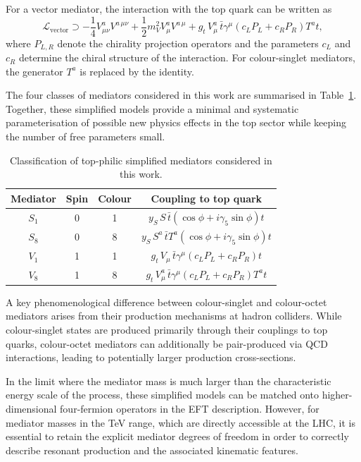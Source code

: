 For a vector mediator, the interaction with the top quark can be written as
\begin{equation}
\mathcal{L}_{\text{vector}} \supset
-\frac{1}{4} V^a_{\mu\nu} V^{a\,\mu\nu}
+ \frac{1}{2} m_V^2 V^a_\mu V^{a\,\mu}
+ g_t\, V^a_\mu\, \bar{t}\gamma^\mu
(c_L P_L + c_R P_R) T^a t ,
\end{equation}
where $P_{L,R}$ denote the chirality projection operators and the parameters 
$c_L$ and $c_R$ determine the chiral structure of the interaction. 
For colour-singlet mediators, the generator $T^a$ is replaced by the identity.

The four classes of mediators considered in this work are summarised in 
Table~\ref{tab:mediators}. 
Together, these simplified models provide a minimal and systematic 
parameterisation of possible new physics effects in the top sector while 
keeping the number of free parameters small.

\begin{table}[htbp]
\centering
\begin{tabular}{cccc}
\hline
Mediator & Spin & Colour & Coupling to top quark \\
\hline
$S_1$ & 0 & 1 & $y_S\,S\,\bar{t}(\cos\phi+i\gamma_5\sin\phi)t$ \\
$S_8$ & 0 & 8 & $y_S\,S^a\,\bar{t}T^a(\cos\phi+i\gamma_5\sin\phi)t$ \\
$V_1$ & 1 & 1 & $g_t\,V_\mu\,\bar{t}\gamma^\mu(c_LP_L+c_RP_R)t$ \\
$V_8$ & 1 & 8 & $g_t\,V^a_\mu\,\bar{t}\gamma^\mu(c_LP_L+c_RP_R)T^a t$ \\
\hline
\end{tabular}
\caption{Classification of top-philic simplified mediators considered in this work.}
\label{tab:mediators}
\end{table}

A key phenomenological difference between colour-singlet and colour-octet 
mediators arises from their production mechanisms at hadron colliders. 
While colour-singlet states are produced primarily through their couplings 
to top quarks, colour-octet mediators can additionally be pair-produced via 
QCD interactions, leading to potentially larger production cross-sections.

In the limit where the mediator mass is much larger than the characteristic 
energy scale of the process, these simplified models can be matched onto 
higher-dimensional four-fermion operators in the EFT description. 
However, for mediator masses in the TeV range, which are directly accessible 
at the LHC, it is essential to retain the explicit mediator degrees of freedom 
in order to correctly describe resonant production and the associated 
kinematic features.

